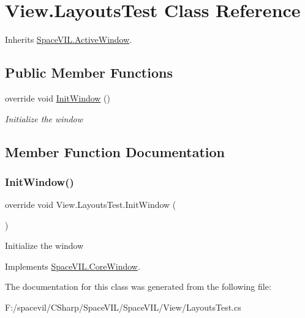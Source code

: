 \hypertarget{class_view_1_1_layouts_test}{}\section{View.\+Layouts\+Test Class Reference}
\label{class_view_1_1_layouts_test}


Inherits \mbox{\hyperlink{class_space_v_i_l_1_1_active_window}{Space\+V\+I\+L.\+Active\+Window}}.

\subsection*{Public Member Functions}
\begin{DoxyCompactItemize}
\item 
override void \mbox{\hyperlink{class_view_1_1_layouts_test_a6e89f1beff3ea667915a0987203df404}{Init\+Window}} ()
\begin{DoxyCompactList}\small\item\em Initialize the window \end{DoxyCompactList}\end{DoxyCompactItemize}


\subsection{Member Function Documentation}
\mbox{\label{class_view_1_1_layouts_test_a6e89f1beff3ea667915a0987203df404}} 
\subsubsection{\texorpdfstring{Init\+Window()}{InitWindow()}}
{\footnotesize\ttfamily override void View.\+Layouts\+Test.\+Init\+Window (\begin{DoxyParamCaption}{ }\end{DoxyParamCaption})\hspace{0.3cm}{\ttfamily [virtual]}}



Initialize the window 



Implements \mbox{\hyperlink{class_space_v_i_l_1_1_core_window_aa3cf4ac54d9651b1149584dc81042824}{Space\+V\+I\+L.\+Core\+Window}}.



The documentation for this class was generated from the following file\+:\begin{DoxyCompactItemize}
\item 
F\+:/spacevil/\+C\+Sharp/\+Space\+V\+I\+L/\+Space\+V\+I\+L/\+View/Layouts\+Test.\+cs\end{DoxyCompactItemize}
